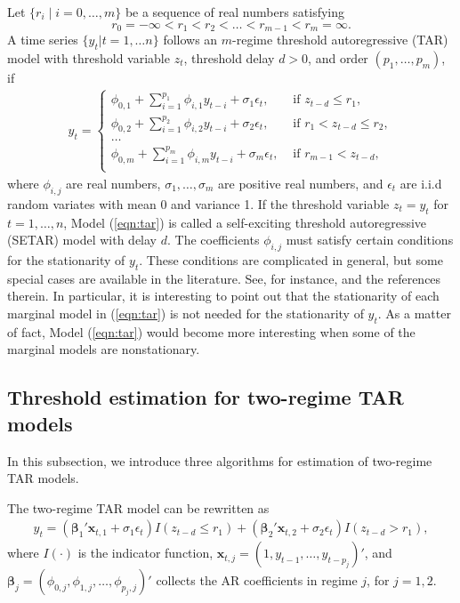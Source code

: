 Let $\{ r_i \mid i=0,\ldots,m\}$ be a sequence of real numbers satisfying
\[
r_0=-\infty <r_1<r_2<\ldots <r_{m-1}<r_m=\infty.
\]
A time series $\{y_t| t=1,\ldots n\}$ follows an $m$-regime threshold autoregressive (TAR) model with threshold variable $z_t$, threshold delay $d>0$, and order $(p_1,\ldots,p_m)$, if
\begin{eqnarray}\label{eqn:tar}
y_t=\left\{
\begin{array}{ll}
\phi_{0,1}+\sum_{i=1}^{p_1} \phi_{i,1}y_{t-i}+\sigma_1 \epsilon_t, &\mbox{ if } z_{t-d} \leq r_1,\\
\phi_{0,2}+\sum_{i=1}^{p_2} \phi_{i,2}y_{t-i}+\sigma_2 \epsilon_t, &\mbox{ if } r_1< z_{t-d} \leq r_2,\\
\ldots\\
\phi_{0,m}+\sum_{i=1}^{p_m} \phi_{i,m}y_{t-i}+\sigma_m \epsilon_t, &\mbox{ if } r_{m-1}<z_{t-d},\\
\end{array}
\right.
\end{eqnarray}
where $\phi_{i,j}$ are real numbers, $\sigma_1,\ldots,\sigma_m$ are positive real numbers, and $\epsilon_t$ are i.i.d random variates with mean 0 and variance 1. If the threshold variable $z_t=y_t$ for $t=1,\ldots, n$, Model (\ref{eqn:tar}) is called a self-exciting threshold autoregressive (SETAR) model with delay $d$. The coefficients $\phi_{i,j}$ must satisfy certain conditions for the
stationarity of  $y_t$. These conditions are complicated in general,
but some special cases are available in the
literature. See, for instance, \cite{chen1991} and the references therein. In particular, it is
interesting to point out that the stationarity of each marginal model in (\ref{eqn:tar}) is not
needed for the stationarity of $y_t$. As a matter of fact, Model (\ref{eqn:tar}) would
become more interesting when some of the marginal models are nonstationary.


\subsection{Threshold estimation for two-regime TAR models}
In this subsection, we introduce three algorithms for estimation of two-regime TAR models.

The two-regime TAR model can be rewritten as
\begin{align}\label{eq:tar2}
y_t=({\boldsymbol{\beta}}_1' {\mathbf x}_{t,1}+\sigma_1\epsilon_t) I(z_{t-d} \leq r_1) +({\boldsymbol{\beta}}_2' {\mathbf x}_{t,2}+\sigma_2 \epsilon_t)I(z_{t-d} > r_1),
\end{align}
where  $I(\cdot)$ is the indicator function, ${\mathbf x}_{t,j}=(1,y_{t-1},\ldots,y_{t-p_j})'$, and $\boldsymbol{\beta}_j=(\phi_{0,j},\phi_{1,j}, \ldots,\phi_{p_j,j})'$ collects the AR coefficients in regime $j$, for $j=1,2$. 

